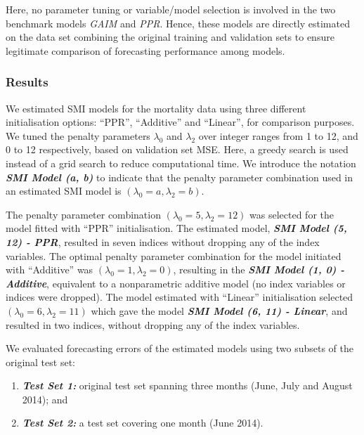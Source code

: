 \documentclass[
  11pt,
  a4paper,
]{article}
\providecommand{\tightlist}{%
  \setlength{\itemsep}{0pt}\setlength{\parskip}{0pt}}\usepackage{longtable,booktabs,array}
\begin{document}
Here, no parameter tuning or variable/model selection is involved in the
two benchmark models \emph{GAIM} and \emph{PPR}. Hence, these models are
directly estimated on the data set combining the original training and
validation sets to ensure legitimate comparison of forecasting
performance among models.

\subsubsection{Results}\label{results}

We estimated SMI models for the mortality data using three different
initialisation options: ``PPR'', ``Additive'' and ``Linear'', for
comparison purposes. We tuned the penalty parameters \(\lambda_{0}\) and
\(\lambda_{2}\) over integer ranges from 1 to 12, and 0 to 12
respectively, based on validation set MSE. Here, a greedy search is used
instead of a grid search to reduce computational time. We introduce the
notation \textbf{\emph{SMI Model (a, b)}} to indicate that the penalty
parameter combination used in an estimated SMI model is
\((\lambda_{0} = a, \lambda_{2} = b)\).

The penalty parameter combination
\((\lambda_{0} = 5, \lambda_{2} = 12)\) was selected for the model
fitted with ``PPR'' initialisation. The estimated model,
\textbf{\emph{SMI Model (5, 12) - PPR}}, resulted in seven indices
without dropping any of the index variables. The optimal penalty
parameter combination for the model initiated with ``Additive'' was
\((\lambda_{0} = 1, \lambda_{2} = 0)\), resulting in the
\textbf{\emph{SMI Model (1, 0) - Additive}}, equivalent to a
nonparametric additive model (no index variables or indices were
dropped). The model estimated with ``Linear'' initialisation selected
\((\lambda_{0} = 6, \lambda_{2} = 11)\) which gave the model
\textbf{\emph{SMI Model (6, 11) - Linear}}, and resulted in two indices,
without dropping any of the index variables.

We evaluated forecasting errors of the estimated models using two
subsets of the original test set:

\begin{enumerate}
\def\labelenumi{\arabic{enumi}.}
\tightlist
\item
  \textbf{\emph{Test Set 1:}} original test set spanning three months
  (June, July and August 2014); and
\item
  \textbf{\emph{Test Set 2:}} a test set covering one month (June 2014).
\end{enumerate}
\end{document}
